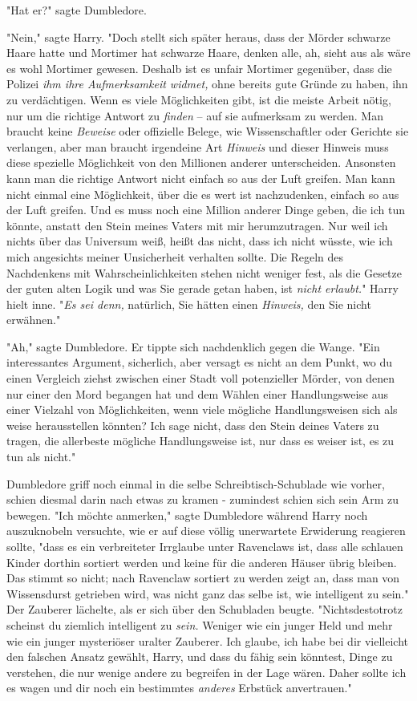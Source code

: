 {"Hat er?" sagte Dumbledore.

"Nein," sagte Harry. "Doch stellt sich später heraus, dass der Mörder schwarze Haare hatte und Mortimer hat schwarze Haare, denken alle, ah, sieht aus als wäre es wohl Mortimer gewesen. Deshalb ist es unfair Mortimer gegenüber, dass die Polizei \emph{ihm ihre Aufmerksamkeit widmet,} ohne bereits gute Gründe zu haben, ihn zu verdächtigen. Wenn es viele Möglichkeiten gibt, ist die meiste Arbeit nötig, nur um die richtige Antwort zu \emph{finden} -- auf sie aufmerksam zu werden. Man braucht keine \emph{Beweise} oder offizielle Belege, wie Wissenschaftler oder Gerichte sie verlangen, aber man braucht irgendeine Art \emph{Hinweis} und dieser Hinweis muss diese spezielle Möglichkeit von den Millionen anderer unterscheiden. Ansonsten kann man die richtige Antwort nicht einfach so aus der Luft greifen. Man kann nicht einmal eine Möglichkeit, über die es wert ist nachzudenken, einfach so aus der Luft greifen. Und es muss noch eine Million anderer Dinge geben, die ich tun könnte, anstatt den Stein meines Vaters mit mir herumzutragen. Nur weil ich nichts über das Universum weiß, heißt das nicht, dass ich nicht wüsste, wie ich mich angesichts meiner Unsicherheit verhalten sollte. Die Regeln des Nachdenkens mit Wahrscheinlichkeiten stehen nicht weniger fest, als die Gesetze der guten alten Logik und was Sie gerade getan haben, ist \emph{nicht erlaubt.}" Harry hielt inne. "\emph{Es sei denn,} natürlich, Sie hätten einen \emph{Hinweis,} den Sie nicht erwähnen."

"Ah," sagte Dumbledore. Er tippte sich nachdenklich gegen die Wange. "Ein interessantes Argument, sicherlich, aber versagt es nicht an dem Punkt, wo du einen Vergleich ziehst zwischen einer Stadt voll potenzieller Mörder, von denen nur einer den Mord begangen hat und dem Wählen einer Handlungsweise aus einer Vielzahl von Möglichkeiten, wenn viele mögliche Handlungsweisen sich als weise herausstellen könnten? Ich sage nicht, dass den Stein deines Vaters zu tragen, die allerbeste mögliche Handlungsweise ist, nur dass es weiser ist, es zu tun als nicht."

Dumbledore griff noch einmal in die selbe Schreibtisch-Schublade wie vorher, schien diesmal darin nach etwas zu kramen - zumindest schien sich sein Arm zu bewegen. "Ich möchte anmerken," sagte Dumbledore während Harry noch auszuknobeln versuchte, wie er auf diese völlig unerwartete Erwiderung reagieren sollte, "dass es ein verbreiteter Irrglaube unter Ravenclaws ist, dass alle schlauen Kinder dorthin sortiert werden und keine für die anderen Häuser übrig bleiben. Das stimmt so nicht; nach Ravenclaw sortiert zu werden zeigt an, dass man von Wissensdurst getrieben wird, was nicht ganz das selbe ist, wie intelligent zu sein." Der Zauberer lächelte, als er sich über den Schubladen beugte. "Nichtsdestotrotz scheinst du ziemlich intelligent zu \emph{sein.} Weniger wie ein junger Held und mehr wie ein junger mysteriöser uralter Zauberer. Ich glaube, ich habe bei dir vielleicht den falschen Ansatz gewählt, Harry, und dass du fähig sein könntest, Dinge zu verstehen, die nur wenige andere zu begreifen in der Lage wären. Daher sollte ich es wagen und dir noch ein bestimmtes \emph{anderes} Erbstück anvertrauen."

}
